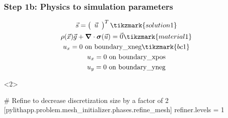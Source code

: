 \documentclass[aspectratio=169]{beamer}
\begin{document}
\begin{frame}[t,fragile]
  \frametitle{Step 1b: Physics to simulation parameters}
  \summary{}

  \begin{minipage}[t]{0.3\textwidth}
    {\scriptsize
    \begin{gather*}
    \vec{s} = \left(\begin{array}{c} \vec{u} \end{array}\right)^T \tikzmark{solution1}\\
    \rho(\vec{x}) \vec{g} + \tensor{\nabla} \cdot \tensor{\sigma}(\vec{u}) = \vec{0} \tikzmark{material1}\\
    u_x = 0 \text{ on boundary\_xneg} \tikzmark{bc1}\\
    u_x = 0 \text{ on boundary\_xpos} \\
    u_y = 0 \text{ on boundary\_yneg} \\
    \end{gather*}}
  \end{minipage}
  \hfill
  \begin{minipage}[t]{0.67\textwidth}
    \begin{onlyenv}<2>
      \begin{cfgcode}
        # Refine to decrease discretization size by a factor of 2
        [pylithapp.problem.mesh_initializer.phases.refine_mesh]
        refiner.levels = 1
      \end{cfgcode}
    \end{onlyenv}
  \end{minipage}

  
\end{frame}
\end{document}
